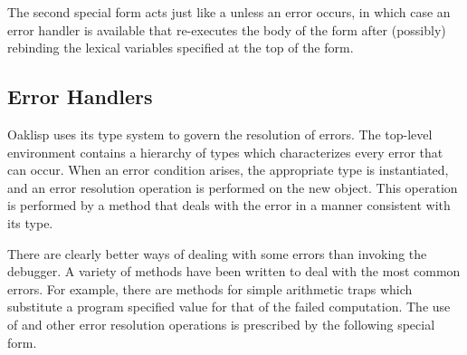 
The second special form acts just like a  unless an error
occurs, in which case an error handler is available that re-executes
the body of the form after (possibly) rebinding the lexical variables
specified at the top of the form.



\subsection{Error Handlers}

Oaklisp uses its type system to govern the resolution of errors.  The
top-level environment contains a hierarchy of types which
characterizes every error that can occur.  When an error condition
arises, the appropriate type is instantiated, and an error resolution
operation is performed on the new object.  This operation is performed
by a method that deals with the error in a manner consistent with its
type.

There are clearly better ways of dealing with some errors than
invoking the debugger.  A variety of methods have been written to deal
with the most common errors.  For example, there are 
methods for simple arithmetic traps which substitute a program
specified value for that of the failed computation.  The use of
 and other error resolution operations is prescribed by
the following special form.

